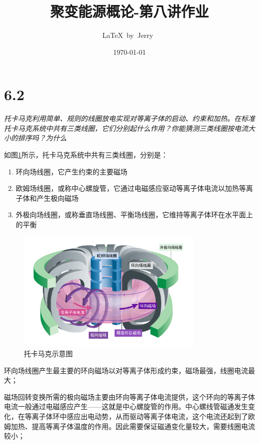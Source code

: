 \documentclass{article}
\title{聚变能源概论-第八讲作业}
\author{\LaTeX\ by\ Jerry\ }
\date{\today}
\begin{document}
\pagestyle{fancy}

\fancyhead[R]{\today}

\section*{6.2}

\emph{托卡马克利用简单、规则的线圈放电实现对等离子体的启动、约束和加热。在标准托卡马克系统中共有三类线圈，它们分别起什么作用？你能猜测三类线圈按电流大小的排序吗？为什么}

如图\ref{fig:tokamak}所示，托卡马克系统中共有三类线圈，分别是：

\begin{enumerate}
    \item 环向场线圈，它产生约束的主要磁场
    \item 欧姆场线圈，或称中心螺旋管，它通过电磁感应驱动等离子体电流以加热等离子体和产生极向磁场
    \item 外极向场线圈，或称垂直场线圈、平衡场线圈，它维持等离子体环在水平面上的平衡
\end{enumerate}

\begin{figure}[htbp]
    \centering
    \includegraphics[width=0.8\textwidth]{img/tokamak.png}
    \caption{托卡马克示意图}
    \label{fig:tokamak}
\end{figure}

环向场线圈产生最主要的环向磁场以对等离子体形成约束，磁场最强，线圈电流最大；

磁场回转变换所需的极向磁场主要由环向等离子体电流提供，这个环向的等离子体电流一般通过电磁感应产生——这就是中心螺旋管的作用。中心螺线管磁通发生变化，在等离子体环中感应出电动势，从而驱动等离子体电流，这个电流还起到了欧姆加热、提高等离子体温度的作用。因此需要保证磁通变化量较大，需要线圈电流较小；
\end{document}
